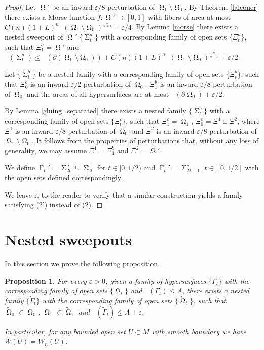 \documentclass[12pt]{amsart}
\newtheorem{proposition}[theorem]{Proposition}
\DeclareMathOperator{\Hn}{\mathcal{H}^n}
\DeclareMathOperator{\Hnn}{\mathcal{H}^{n+1}}
\DeclareMathOperator{\G}{\Gamma}
\DeclareMathOperator{\Om}{\Omega}
\DeclareMathOperator{\Si}{\Sigma}
\theoremstyle{definition}
\begin{document}
\begin{proof}

Let $\Om'$ be an inward $\varepsilon/8$-perturbation 
of $\Om_1 \setminus \Om_0$.
By Theorem \ref*{falconer}
there exists a Morse function $f: \Om' \rightarrow [0,1]$
with fibers of area at most 
$C(n)(1+L)^n \Hnn(\Om_1 \setminus \Om_0)^{\frac{n}{n+1}}
+ \varepsilon/4$.
By Lemma \ref*{morse} there exists a nested sweepout of $\Om'$ 
$\{ \Si_t^a \}$ with a corresponding family of open sets
$\{ \Xi_t^a \}$, such that $\Xi_1^a = \Om'$ and
$\Hn(\Si_t^a) \leq \Hn(\partial (\Om_1 \setminus \Om_0))+ C(n)(1+L)^n \Hnn(\Om_1 \setminus \Om_0)^{\frac{n}{n+1}}
+ \varepsilon/2$.

Let $\{ \Si_t^b \}$ be a nested family with a corresponding family of open sets
$\{ \Xi_t^b \}$, such that $\Xi_0^b$ is an inward $\varepsilon/2$-perturbation
of $\Om_0$, $\Xi_1^b$ is an inward $\varepsilon/8$-perturbation
of $\Om_0$ and the areas of all hypersurfaces are at most
$\Hn(\partial \Om_0)+ \varepsilon/2$.

By Lemma \ref*{gluing_separated} there exists a nested family
$\{ \Si_t^c \}$ with a corresponding family of open sets
$\{ \Xi_t^c \}$, such that $\Xi_1^c = \Om_1$,
$\Xi_0^c = \Xi^1 \sqcup \Xi^2$,
where $\Xi^1$ is an inward $\varepsilon/8$-perturbation 
of $\Om_0$ and $\Xi^2$ is an inward $\varepsilon/8$-perturbation 
of $\Om_1 \setminus \Om_0$. It follows from the properties of perturbations
that, without any loss of generality, we may assume 
$\Xi^1 = \Xi_1^b$ and $\Xi^2 = \Om'$.

We define $\G_t' = \Si_{2t}^a \cup \Si_{2t}^b$
for $t \in [0,1/2)$ and $\G_t' = \Si_{2t-1}^c$
$t \in [0,1/2]$ with the open sets defined correspondingly.

We leave it to the reader to verify that
a similar construction yields a family satisfying
(2') instead of (2).
\end{proof}

\section{Nested sweepouts}


In this section we prove the following proposition.

\begin{proposition}
	\label{prop:nested}
For every $\varepsilon > 0$, given a family of hypersurfaces
$\{ \Gamma_t \}$ with the corresponding family
of open sets $\{ \Om_t \}$ and
$\Hn(\Gamma_t)\leq A$, there exists a nested family
$\{ \tilde{\Gamma}_t \}$  with the corresponding family
of open sets $\{ \tilde{\Om}_t \}$,
such that $\tilde{\Om}_0 \subset \Om_0$,
$\Om_1 \subset \tilde{\Om}_1$ and
$\Hn(\tilde{\Gamma}_t)\leq A + \varepsilon$.

In particular,	for any bounded open set
$U \subset M$ with smooth boundary we have $W(U) = W_n(U)$.

\end{proposition}
\end{document}
